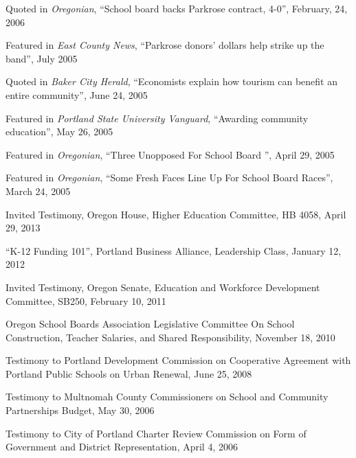 \documentclass[Computer Science]{vita}
\begin{document}
\begin{vita}
\begin{Media Outreach}
  \item Quoted in \emph{Oregonian}, ``School board backs Parkrose
    contract, 4-0'', February, 24, 2006

  \item Featured in \emph{East County News}, ``Parkrose donors'
    dollars help strike up the band'', July 2005

  \item Quoted in \emph{Baker City Herald}, ``Economists explain how
    tourism can benefit an entire community'', June 24, 2005
	
  \item Featured in \emph{Portland State University Vanguard},
    ``Awarding community education'', May 26, 2005
	
  \item Featured in \emph{Oregonian}, ``Three Unopposed For School
    Board '', April 29, 2005
	
  \item Featured in \emph{Oregonian}, ``Some Fresh Faces Line Up For
    School Board Races'', March 24, 2005

  \end{Media Outreach}

  \begin{Community Outreach}
  
  \item Invited Testimony, Oregon House, Higher Education Committee, HB 4058, April 29, 2013

\item ``K-12 Funding 101'', Portland Business Alliance, Leadership Class, January 12, 2012

\item Invited Testimony, Oregon Senate, Education and Workforce Development Committee, SB250, February 10, 2011 
  
\item Oregon School Boards Association Legislative Committee On School Construction, Teacher Salaries, and Shared Responsibility, November 18, 2010   

  \item Testimony to Portland Development Commission on Cooperative
    Agreement with Portland Public Schools on Urban Renewal, June 25,
    2008

  \item Testimony to Multnomah County Commissioners on School and
    Community Partnerships Budget, May 30, 2006

  \item Testimony to City of Portland Charter Review Commission on
    Form of Government and District Representation, April 4, 2006


\end{Community Outreach}
\end{vita}
\end{document}
